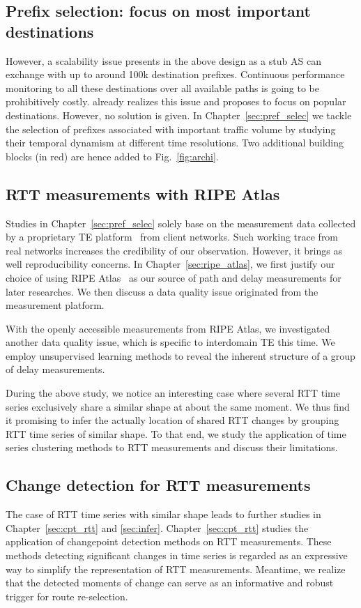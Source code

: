 \subsection{Prefix selection: focus on most important destinations}
However, a scalability issue presents in the above design as a stub AS can exchange with up to around 100k destination prefixes.
Continuous performance monitoring to all these destinations over all available paths is going to be prohibitively costly.
\citet{Feamster2003} already realizes this issue and proposes to focus on popular destinations.
However, no solution is given.
In Chapter~\ref{sec:pref_selec} we tackle the selection of prefixes associated with important traffic volume by studying their temporal dynamism at different time resolutions. Two additional building blocks (in red) are hence added to Fig.~\ref{fig:archi}.

\subsection{RTT measurements with RIPE Atlas}
Studies in Chapter~\ref{sec:pref_selec} solely base on the measurement data collected by a proprietary TE platform~\cite{b6} from client networks. Such working trace from real networks increases the credibility of our observation. However, it brings as well reproducibility concerns.
In Chapter~\ref{sec:ripe_atlas}, we first justify our choice of using RIPE Atlas~\cite{atlas} as our source of path and delay measurements for later researches.
We then discuss a data quality issue originated from the measurement platform.

With the openly accessible measurements from RIPE Atlas, we investigated another data quality issue, which is specific to interdomain TE this time. We employ unsupervised learning methods to reveal the inherent structure of a group of delay measurements.

During the above study, we notice an interesting case where several RTT time series exclusively share a similar shape at about the same moment.
We thus find it promising to infer the actually location of shared RTT changes by grouping RTT time series of similar shape. To that end, we study the application of time series clustering methods to RTT measurements and discuss their limitations.

\subsection{Change detection for RTT measurements}
The case of RTT time series with similar shape leads to further studies in Chapter~\ref{sec:cpt_rtt} and \ref{sec:infer}. Chapter~\ref{sec:cpt_rtt} studies the application of changepoint detection methods on RTT measurements. These methods detecting significant changes in time series is regarded as an expressive way to simplify the representation of RTT measurements. Meantime, we realize that the detected moments of change can serve as an informative and robust trigger for route re-selection.

